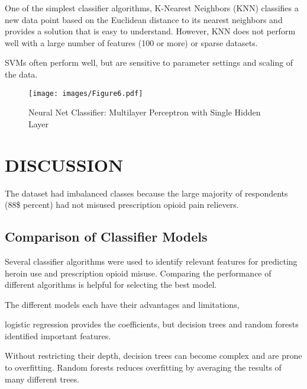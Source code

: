 \documentclass[sigconf]{acmart}
\begin{document}
One of the simplest classifier algorithms, K-Nearest Neighbors (KNN)
classifies a new data point based on the Euclidean distance to its 
nearest neighbors and provides a solution that is easy to understand. 
However, KNN does not perform well with a large number of features 
(100 or more) or sparse datasets.

SVMs often perform well, but are sensitive to parameter settings 
and scaling of the data. 

\begin{figure}[!ht]
  \centering\texttt{[image: images/Figure6.pdf]}
  \caption{Neural Net Classifier: Multilayer Perceptron with Single Hidden Layer}
  \label{f:Figur6}
\end{figure}




\section{DISCUSSION}


The dataset had imbalanced classes because the large majority of respondents 
(88\$ percent) had not misused prescription opioid pain relievers. 





 

\subsection{Comparison of Classifier Models}

Several classifier algorithms were used to identify relevant features for 
predicting heroin use and prescription opioid misuse. Comparing the performance 
of different algorithms is helpful for  selecting the best model. 

The different models each have their advantages and limitations, 

logistic regression provides the coefficients, but decision trees and 
random forests identified important features.

Without restricting their depth, decision trees can become complex and are 
prone to overfitting. Random forests reduces overfitting by averaging the results of many different
trees.
\end{document}

